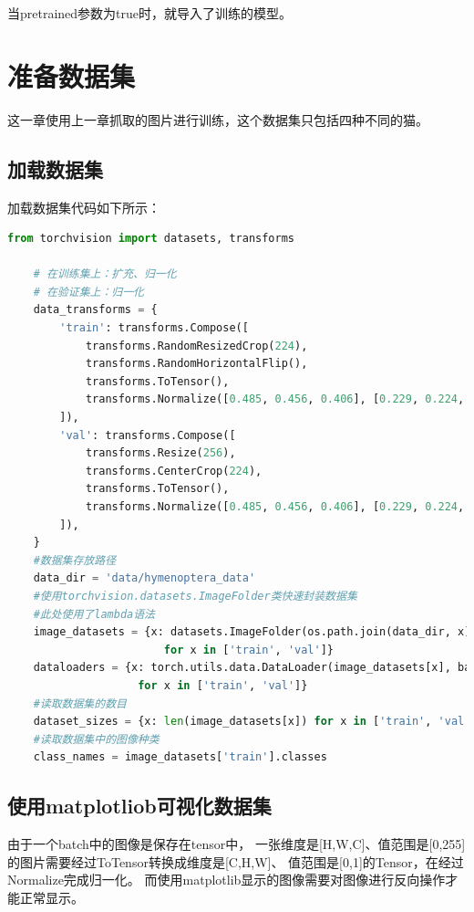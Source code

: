 \documentclass[12pt, a4paper, oneside]{ctexart} %
\begin{document}
当pretrained参数为true时，就导入了训练的模型。


\section{准备数据集}

这一章使用上一章抓取的图片进行训练，这个数据集只包括四种不同的猫。


\subsection{加载数据集}

加载数据集代码如下所示：

\begin{lstlisting}[language=Python]
    from torchvision import datasets, transforms

    # 在训练集上：扩充、归一化
    # 在验证集上：归一化
    data_transforms = {
        'train': transforms.Compose([
            transforms.RandomResizedCrop(224),
            transforms.RandomHorizontalFlip(),
            transforms.ToTensor(),
            transforms.Normalize([0.485, 0.456, 0.406], [0.229, 0.224, 0.225])
        ]),
        'val': transforms.Compose([
            transforms.Resize(256),
            transforms.CenterCrop(224),
            transforms.ToTensor(),
            transforms.Normalize([0.485, 0.456, 0.406], [0.229, 0.224, 0.225])
        ]),
    }
    #数据集存放路径
    data_dir = 'data/hymenoptera_data'
    #使用torchvision.datasets.ImageFolder类快速封装数据集
    #此处使用了lambda语法
    image_datasets = {x: datasets.ImageFolder(os.path.join(data_dir, x),data_transforms[x])
                        for x in ['train', 'val']}
    dataloaders = {x: torch.utils.data.DataLoader(image_datasets[x], batch_size=4,shuffle=True, num_workers=4)
                    for x in ['train', 'val']}
    #读取数据集的数目
    dataset_sizes = {x: len(image_datasets[x]) for x in ['train', 'val']}
    #读取数据集中的图像种类
    class_names = image_datasets['train'].classes
\end{lstlisting}


\subsection{使用matplotliob可视化数据集}

由于一个batch中的图像是保存在tensor中，
一张维度是[H,W,C]、值范围是[0,255]的图片需要经过ToTensor转换成维度是[C,H,W]、
值范围是[0,1]的Tensor，在经过Normalize完成归一化。
而使用matplotlib显示的图像需要对图像进行反向操作才能正常显示。
\end{document}
